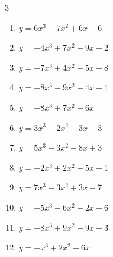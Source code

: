 \begin{multicols}{3}
\begin{enumerate}

  \item $y=6x^{3}+7x^{2}+6x-6$


  \item $y=-4x^{3}+7x^{2}+9x+2$


  \item $y=-7x^{3}+4x^{2}+5x+8$


  \item $y=-8x^{3}-9x^{2}+4x+1$


  \item $y=-8x^{3}+7x^{2}-6x$


  \item $y=3x^{3}-2x^{2}-3x-3$


  \item $y=5x^{3}-3x^{2}-8x+3$


  \item $y=-2x^{3}+2x^{2}+5x+1$


  \item $y=7x^{3}-3x^{2}+3x-7$


  \item $y=-5x^{3}-6x^{2}+2x+6$


  \item $y=-8x^{3}+9x^{2}+9x+3$


\columnbreak %

  \item $y=-x^{3}+2x^{2}+6x$


\end{enumerate}
\end{multicols}
